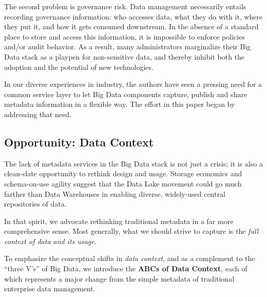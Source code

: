 \documentclass{sig-alternate}
\begin{document}
The second problem is governance risk. Data management necessarily entails recording governance information: who accesses data, what they do with it, where they put it, and how it gets consumed downstream. 
In the absence of a standard place to store and access this information, it is impossible to enforce policies and/or audit behavior. As a result, many administrators marginalize their Big Data stack as a playpen for non-sensitive data, and thereby inhibit both the adoption and the potential of new technologies.

In our diverse experiences in industry, the authors have seen a pressing need for a common service layer to let Big Data components capture, publish and share metadata information in a flexible way. The effort in this paper began by addressing that need.

\subsection{Opportunity: Data Context}
The lack of metadata services in the Big Data stack is not just a crisis; it is also a clean-slate opportunity to rethink design and usage. Storage economics and schema-on-use agility suggest that the Data Lake movement could go much farther than Data Warehouses in enabling diverse, widely-used central repositories of data.

In that spirit, we advocate rethinking traditional metadata in a far more comprehensive sense. Most generally, what we should strive to capture is the \emph{full context of data and its usage}. 

To emphasize the conceptual shifts in \emph{data context}, and as a complement to the ``three V's'' of Big Data,
we introduce the \textbf{ABCs of Data Context}, each of which represents a major change from the simple metadata of traditional enterprise data management.

\end{document}

